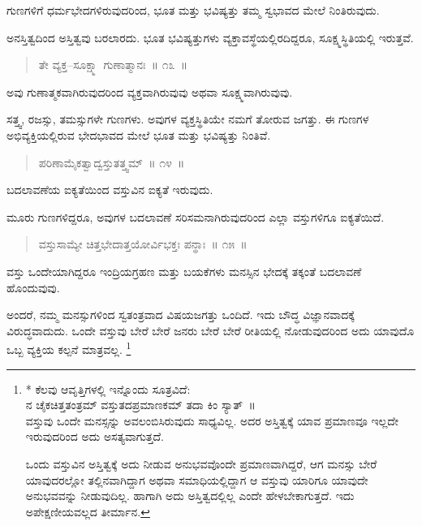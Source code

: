 ಗುಣಗಳಿಗೆ ಧರ್ಮಭೇದಗಳಿರುವುದರಿಂದ, ಭೂತ ಮತ್ತು ಭವಿಷ್ಯತ್ತು ತಮ್ಮ ಸ್ವಭಾವದ ಮೇಲೆ ನಿಂತಿರುವುದು. 

ಅನಸ್ತಿತ್ವದಿಂದ ಅಸ್ತಿತ್ವವು ಬರಲಾರದು. ಭೂತ ಭವಿಷ್ಯತ್ತುಗಳು ವ್ಯಕ್ತಾವಸ್ಥೆಯಲ್ಲಿರದಿದ್ದರೂ, ಸೂಕ್ಷ್ಮಸ್ಥಿತಿಯಲ್ಲಿ ಇರುತ್ತವೆ. 

\vspace{-0.3cm}

\begin{verse}
ತೇ ವ್ಯಕ್ತ–ಸೂಕ್ಷ್ಮಾ ಗುಣಾತ್ಮಾನಃ~॥ ೧೩~॥
\end{verse}

\vspace{-0.3cm}

ಅವು ಗುಣಾತ್ಮಕವಾಗಿರುವುದರಿಂದ ವ್ಯಕ್ತವಾಗಿರುವುವು ಅಥವಾ ಸೂಕ್ಷ್ಮವಾಗಿರುವುವು. 

ಸತ್ತ್ವ, ರಜಸ್ಸು, ತಮಸ್ಸುಗಳೇ ಗುಣಗಳು. ಅವುಗಳ ವ್ಯಕ್ತಸ್ಥಿತಿಯೇ ನಮಗೆ ತೋರುವ ಜಗತ್ತು. ಈ ಗುಣಗಳ ಅಭಿವ್ಯಕ್ತಿಯಲ್ಲಿರುವ ಭೇದಭಾವದ ಮೇಲೆ ಭೂತ ಮತ್ತು ಭವಿಷ್ಯತ್ತು ನಿಂತಿವೆ. 

\eject

\begin{verse}
ಪರಿಣಾಮೈಕತ್ವಾದ್ವಸ್ತುತತ್ತ್ವಮ್​~॥ ೧೪~॥
\end{verse}

\vspace{-0.3cm}

ಬದಲಾವಣೆಯ ಐಕ್ಯತೆಯಿಂದ ವಸ್ತುವಿನ ಐಕ್ಯತೆ ಇರುವುದು. 

ಮೂರು ಗುಣಗಳಿದ್ದರೂ, ಅವುಗಳ ಬದಲಾವಣೆ ಸರಿಸಮನಾಗಿರುವುದರಿಂದ ಎಲ್ಲಾ ವಸ್ತುಗಳಿಗೂ ಐಕ್ಯತೆಯಿದೆ. 

\vspace{-0.3cm}

\begin{verse}
ವಸ್ತುಸಾಮ್ಯೇ ಚಿತ್ತಭೇದಾತ್ತಯೋರ್ವಿಭಕ್ತಃ ಪನ್ಥಾಃ~॥ ೧೫~॥
\end{verse}

\vspace{-0.3cm}

ವಸ್ತು ಒಂದೇಯಾಗಿದ್ದರೂ ಇಂದ್ರಿಯಗ್ರಹಣ ಮತ್ತು ಬಯಕೆಗಳು ಮನಸ್ಸಿನ ಭೇದಕ್ಕೆ ತಕ್ಕಂತೆ ಬದಲಾವಣೆ ಹೊಂದುವುವು. 

ಅಂದರೆ, ನಮ್ಮ ಮನಸ್ಸುಗಳಿಂದ ಸ್ವತಂತ್ರವಾದ ವಿಷಯಜಗತ್ತು ಒಂದಿದೆ. ಇದು ಬೌದ್ಧ ವಿಜ್ಞಾನವಾದಕ್ಕೆ ವಿರುದ್ಧವಾದುದು. ಒಂದೇ ವಸ್ತುವು ಬೇರೆ ಬೇರೆ ಜನರು ಬೇರೆ ಬೇರೆ ರೀತಿಯಲ್ಲಿ ನೋಡುವುದರಿಂದ ಅದು ಯಾವುದೊ ಒಬ್ಬ ವ್ಯಕ್ತಿಯ ಕಲ್ಪನೆ ಮಾತ್ರವಲ್ಲ. \footnote{* ಕೆಲವು ಆವೃತ್ತಿಗಳಲ್ಲಿ ಇನ್ನೊಂದು ಸೂತ್ರವಿದೆ:\\ನ ಚೈಕಚಿತ್ತತಂತ್ರಮ್​ ವಸ್ತುತದಪ್ರಮಾಣಕಮ್​ ತದಾ ಕಿಂ ಸ್ಯಾತ್​~॥\\ವಸ್ತುವು ಒಂದೇ ಮನಸ್ಸನ್ನು ಅವಲಂಬಿಸಿರುವುದು ಸಾಧ್ಯವಿಲ್ಲ. ಅದರ ಅಸ್ತಿತ್ವಕ್ಕೆ ಯಾವ ಪ್ರಮಾಣವೂ ಇಲ್ಲದೇ ಇರುವುದರಿಂದ ಅದು ಅಸತ್ಯವಾಗುತ್ತದೆ.

ಒಂದು ವಸ್ತುವಿನ ಅಸ್ತಿತ್ವಕ್ಕೆ ಅದು ನೀಡುವ ಅನುಭವವೊಂದೇ ಪ್ರಮಾಣವಾಗಿದ್ದರೆ, ಆಗ ಮನಸ್ಸು ಬೇರೆ ಯಾವುದರಲ್ಲೋ ತಲ್ಲಿನವಾಗಿದ್ದಾಗ ಅಥವಾ ಸಮಾಧಿಯಲ್ಲಿದ್ದಾಗ ಆ ವಸ್ತುವು ಯಾರಿಗೂ ಯಾವುದೇ ಅನುಭವವನ್ನು ನೀಡುವುದಿಲ್ಲ. ಹಾಗಾಗಿ ಅದು ಅಸ್ತಿತ್ವದಲ್ಲಿಲ್ಲ ಎಂದೇ ಹೇಳಬೇಕಾಗುತ್ತದೆ. ಇದು ಅಪೇಕ್ಷಣೀಯವಲ್ಲದ ತೀರ್ಮಾನ.}

